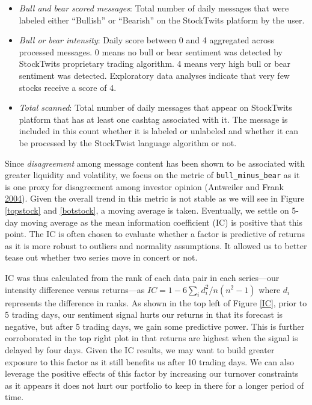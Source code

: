\documentclass[11,]{article}
\providecommand{\tightlist}{%
  \setlength{\itemsep}{0pt}\setlength{\parskip}{0pt}}
\begin{document}
\begin{itemize}
\tightlist
\item
  \emph{Bull and bear scored messages}: Total number of daily messages
  that were labeled either ``Bullish'' or ``Bearish'' on the StockTwits
  platform by the user.
\item
  \emph{Bull or bear intensity}: Daily score between 0 and 4 aggregated
  across processed messages. 0 means no bull or bear sentiment was
  detected by StockTwits proprietary trading algorithm. 4 means very
  high bull or bear sentiment was detected. Exploratory data analyses
  indicate that very few stocks receive a score of 4.
\item
  \emph{Total scanned}: Total number of daily messages that appear on
  StockTwits platform that has at least one cashtag associated with it.
  The message is included in this count whether it is labeled or
  unlabeled and whether it can be processed by the StockTwist language
  algorithm or not.
\end{itemize}

Since \emph{disagreement} among message content has been shown to be
associated with greater liquidity and volatility, we focus on the metric
of \texttt{bull\_minus\_bear} as it is one proxy for disagreement among
investor opinion (Antweiler and Frank
\protect\hyperlink{ref-antweiler2004}{2004}). Given the overall trend in
this metric is not stable as we will see in Figure \ref{topstock} and
\ref{botstock}, a moving average is taken. Eventually, we settle on
5-day moving average as the mean information coefficient (IC) is
positive that this point. The IC is often chosen to evaluate whether a
factor is predictive of returns as it is more robust to outliers and
normality assumptions. It allowed us to better tease out whether two
series move in concert or not.

IC was thus calculated from the rank of each data pair in each
series---our intensity difference versus returns---as
\(IC = 1- 6\sum_i d_i^2 / n(n^2-1)\) where \(d_i\) represents the
difference in ranks. As shown in the top left of Figure \ref{IC}, prior
to 5 trading days, our sentiment signal hurts our returns in that its
forecast is negative, but after 5 trading days, we gain some predictive
power. This is further corroborated in the top right plot in that
returns are highest when the signal is delayed by four days. Given the
IC results, we may want to build greater exposure to this factor as it
still benefits us after 10 trading days. We can also leverage the
positive effects of this factor by increasing our turnover constraints
as it appears it does not hurt our portfolio to keep in there for a
longer period of time.
\end{document}
